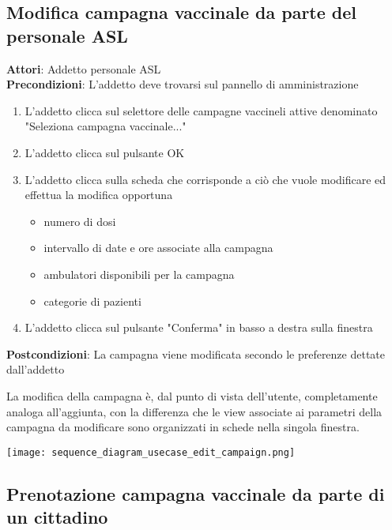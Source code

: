 \documentclass{article}
\begin{document}
\newpage

\subsection{Modifica campagna vaccinale da parte del personale ASL}

\begin{framed}
    \noparskip{}
    \textbf{Attori}: Addetto personale ASL\\
    \textbf{Precondizioni}: L'addetto deve trovarsi sul pannello di amministrazione
    \begin{enumerate}
        \item L'addetto clicca sul selettore delle campagne vaccineli attive denominato "Seleziona campagna vaccinale..."
        \item L'addetto clicca sul pulsante OK
        \item L'addetto clicca sulla scheda che corrisponde a ciò che vuole modificare ed effettua la modifica opportuna
            \begin{itemize}
                \item numero di dosi
                \item intervallo di date e ore associate alla campagna
                \item ambulatori disponibili per la campagna
                \item categorie di pazienti
            \end{itemize}
        \item L'addetto clicca sul pulsante "Conferma" in basso a destra sulla finestra
    \end{enumerate}
    \textbf{Postcondizioni}: La campagna viene modificata secondo le preferenze dettate dall'addetto
\end{framed}

La modifica della campagna è, dal punto di vista dell'utente, completamente analoga all'aggiunta, con la differenza che le view associate ai parametri della campagna da modificare sono organizzati in schede nella singola finestra.

\begin{center}
    \texttt{[image: sequence\_diagram\_usecase\_edit\_campaign.png]}
\end{center}

\newpage

\subsection{Prenotazione campagna vaccinale da parte di un cittadino}
\end{document}
